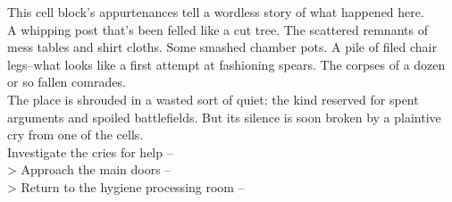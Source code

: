This cell block’s appurtenances tell a wordless story of what happened here.\\

A whipping post that’s been felled like a cut tree. The scattered remnants of mess tables and shirt cloths. Some smashed chamber pots. A pile of filed chair legs--what looks like a first attempt at fashioning spears. The corpses of a dozen or so fallen comrades.\\

The place is shrouded in a wasted sort of quiet: the kind reserved for spent arguments and spoiled battlefields. But its silence is soon broken by a plaintive cry from one of the cells.\\

 Investigate the cries for help -- \\
> Approach the main doors -- \\
> Return to the hygiene processing room -- 